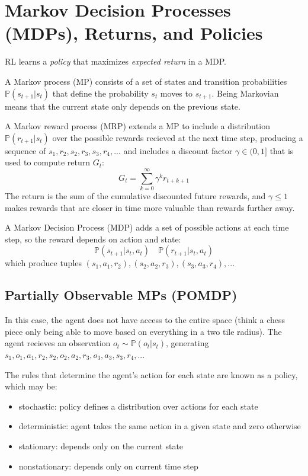 \documentclass[11pt]{article}
\newcommand{\Pbb}{\mathbb{P}}
\begin{document}
\section{Markov Decision Processes (MDPs), Returns, and Policies}
RL learns a \emph{policy} that maximizes \emph{expected return} in a MDP.

A Markov process (MP) consists of a set of states and transition probabilities $\Pbb (s_{t+1}|s_t)$ that define the probability $s_t$ moves to $s_{t+1}$. Being Markovian means that the current state only depends on the previous state.

A Markov reward process (MRP) extends a MP to include a distribution $\Pbb (r_{t+1}|s_t)$ over the possible rewards recieved at the next time step, producing a sequence of $s_1, r_2, s_2, r_3, s_3, r_4,...$ and includes a discount factor $\gamma \in (0,1]$ that is used to compute return $G_t$:
\[
G_t=\sum_{k=0}^{\infty} \gamma^k r_{t+k+1}
\]
The return is the sum of the cumulative discounted future rewards, and $\gamma \le 1$ makes rewards that are closer in time more valuable than rewards further away.

A Markov Decision Process (MDP) adds a set of possible actions at each time step, so the reward depends on action and state: 
\[
\Pbb (s_{t+1}|s_t, a_t) \quad \Pbb (r_{t+1}|s_t, a_t)
\]
which produce tuples $(s_1, a_1, r_2),(s_2, a_2, r_3),(s_3, a_3, r_4),...$
\subsection*{Partially Observable MPs (POMDP)}
In this case, the agent does not have access to the entire space (think a chess piece only being able to move based on everything in a two tile radius). The agent recieves an observation $o_t \sim \Pbb (o_t | s_t)$, generating $s_1, o_1, a_1, r_2, s_2, o_2, a_2, r_3, o_3, a_3, s_3, r_4, ...$

The rules that determine the agent's action for each state are known as a policy, which may be:
\begin{itemize}
    \item stochastic: policy defines a distribution over actions for each state
    \item deterministic: agent takes the same action in a given state and zero otherwise
    \item stationary: depends only on the current state
    \item nonstationary: depends only on current time step
\end{itemize}
\end{document}
